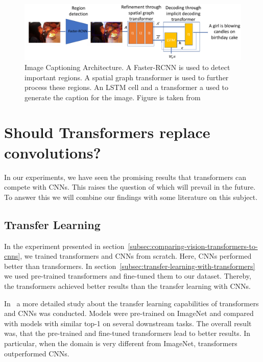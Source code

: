 \documentclass[a4paper]{scrartcl}
\let\stdsection\section
\renewcommand\section{\newpage\stdsection}
\begin{document}
    \begin{figure}[btp]
        \centering
        \includegraphics[width=1.0\linewidth]{img/ImageCaptioningArchitecture}
        \caption[Image Captioning Architecture]{Image Captioning Architecture.
        A Faster-RCNN is used to detect important regions.
        A spatial graph transformer is used to further process these regions.
        An LSTM cell and a transformer a used to generate the caption for the image.
        Figure is taken from~\cite{he2021image}}
        \label{fig:image-captioning-architecture}
    \end{figure}



    \section{Should Transformers replace convolutions?}\label{sec:should-transformers-replace-convolutions?}
    In our experiments, we have seen the promising results that transformers can compete with CNNs.
    This raises the question of which will prevail in the future.
    To answer this we will combine our findings with some literature on this subject.

    \subsection{Transfer Learning}\label{subsubsec:transfer-learning}
    In the experiment presented in section~\ref{subsec:comparing-vision-transformers-to-cnns}, we trained transformers and CNNs from scratch.
    Here, CNNs performed better than transformers.
    In section~\ref{subsec:transfer-learning-with-transformers} we used pre-trained transformers and fine-tuned them to our dataset.
    Thereby, the transformers achieved better results than the transfer learning with CNNs.

    In~\cite{zhou2021convnets} a more detailed study about the transfer learning capabilities of transformers and CNNs was conducted.
    Models were pre-trained on ImageNet and compared with models with similar top-1 on several downstream tasks.
    The overall result was, that the pre-trained and fine-tuned transformers lead to better results.
    In particular, when the domain is very different from ImageNet, transformers outperformed CNNs.
\end{document}
